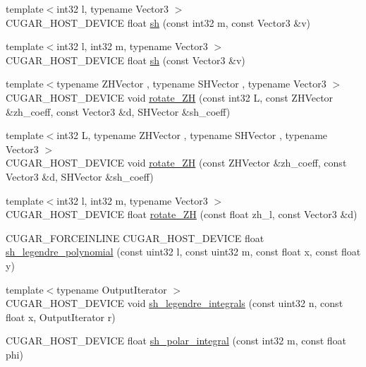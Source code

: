 \begin{DoxyCompactItemize}
\item 
{\footnotesize template$<$int32 l, typename Vector3 $>$ }\\C\+U\+G\+A\+R\+\_\+\+H\+O\+S\+T\+\_\+\+D\+E\+V\+I\+CE float \hyperlink{group__spherical__harmonics_gacbaf1fe0a158310ce09117940766f617}{sh} (const int32 m, const Vector3 \&v)
\item 
{\footnotesize template$<$int32 l, int32 m, typename Vector3 $>$ }\\C\+U\+G\+A\+R\+\_\+\+H\+O\+S\+T\+\_\+\+D\+E\+V\+I\+CE float \hyperlink{group__spherical__harmonics_ga41a8f3c96516611a04d677c1af75c542}{sh} (const Vector3 \&v)
\item 
{\footnotesize template$<$typename Z\+H\+Vector , typename S\+H\+Vector , typename Vector3 $>$ }\\C\+U\+G\+A\+R\+\_\+\+H\+O\+S\+T\+\_\+\+D\+E\+V\+I\+CE void \hyperlink{group__spherical__harmonics_ga5d1edfb2dfc7c53051c512e0d7c6d21d}{rotate\+\_\+\+ZH} (const int32 L, const Z\+H\+Vector \&zh\+\_\+coeff, const Vector3 \&d, S\+H\+Vector \&sh\+\_\+coeff)
\item 
{\footnotesize template$<$int32 L, typename Z\+H\+Vector , typename S\+H\+Vector , typename Vector3 $>$ }\\C\+U\+G\+A\+R\+\_\+\+H\+O\+S\+T\+\_\+\+D\+E\+V\+I\+CE void \hyperlink{group__spherical__harmonics_ga26fd25de1095f8c798028bce5bcf3922}{rotate\+\_\+\+ZH} (const Z\+H\+Vector \&zh\+\_\+coeff, const Vector3 \&d, S\+H\+Vector \&sh\+\_\+coeff)
\item 
{\footnotesize template$<$int32 l, int32 m, typename Vector3 $>$ }\\C\+U\+G\+A\+R\+\_\+\+H\+O\+S\+T\+\_\+\+D\+E\+V\+I\+CE float \hyperlink{group__spherical__harmonics_gafb4e2ee177fc0d4bf43999edd3aed697}{rotate\+\_\+\+ZH} (const float zh\+\_\+l, const Vector3 \&d)
\item 
C\+U\+G\+A\+R\+\_\+\+F\+O\+R\+C\+E\+I\+N\+L\+I\+NE C\+U\+G\+A\+R\+\_\+\+H\+O\+S\+T\+\_\+\+D\+E\+V\+I\+CE float \hyperlink{group__spherical__harmonics_ga42386bd8275ff973952f8d88e6c58cbf}{sh\+\_\+legendre\+\_\+polynomial} (const uint32 l, const uint32 m, const float x, const float y)
\item 
{\footnotesize template$<$typename Output\+Iterator $>$ }\\C\+U\+G\+A\+R\+\_\+\+H\+O\+S\+T\+\_\+\+D\+E\+V\+I\+CE void \hyperlink{group__spherical__harmonics_ga609b7d6a3f4d56d1d111b6d50a8d82a7}{sh\+\_\+legendre\+\_\+integrals} (const uint32 n, const float x, Output\+Iterator r)
\item 
C\+U\+G\+A\+R\+\_\+\+H\+O\+S\+T\+\_\+\+D\+E\+V\+I\+CE float \hyperlink{group__spherical__harmonics_ga8018a68e82e9f27c253af9880d70f98d}{sh\+\_\+polar\+\_\+integral} (const int32 m, const float phi)

\end{DoxyCompactItemize}
